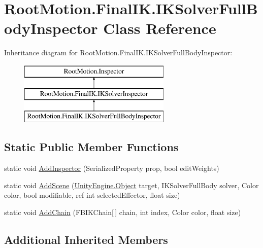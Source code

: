 \hypertarget{class_root_motion_1_1_final_i_k_1_1_i_k_solver_full_body_inspector}{}\section{Root\+Motion.\+Final\+I\+K.\+I\+K\+Solver\+Full\+Body\+Inspector Class Reference}
\label{class_root_motion_1_1_final_i_k_1_1_i_k_solver_full_body_inspector}
Inheritance diagram for Root\+Motion.\+Final\+I\+K.\+I\+K\+Solver\+Full\+Body\+Inspector\+:\begin{figure}[H]
\begin{center}
\leavevmode
\includegraphics[height=3.000000cm]{class_root_motion_1_1_final_i_k_1_1_i_k_solver_full_body_inspector}
\end{center}
\end{figure}
\subsection*{Static Public Member Functions}
\begin{DoxyCompactItemize}
\item 
static void \mbox{\hyperlink{class_root_motion_1_1_final_i_k_1_1_i_k_solver_full_body_inspector_a530337ea6a3025a58a814f9b6b3dfee3}{Add\+Inspector}} (Serialized\+Property prop, bool edit\+Weights)
\item 
static void \mbox{\hyperlink{class_root_motion_1_1_final_i_k_1_1_i_k_solver_full_body_inspector_a25e84c1c802350a48d6c4990bafbfefc}{Add\+Scene}} (\mbox{\hyperlink{_triangles_8cs_aef19bab18b9814edeef255c43e4f6bbc}{Unity\+Engine.\+Object}} target, I\+K\+Solver\+Full\+Body solver, Color color, bool modifiable, ref int selected\+Effector, float size)
\item 
static void \mbox{\hyperlink{class_root_motion_1_1_final_i_k_1_1_i_k_solver_full_body_inspector_abcf43725109aaa2ae15cc8da452c94aa}{Add\+Chain}} (F\+B\+I\+K\+Chain\mbox{[}$\,$\mbox{]} chain, int index, Color color, float size)
\end{DoxyCompactItemize}
\subsection*{Additional Inherited Members}


